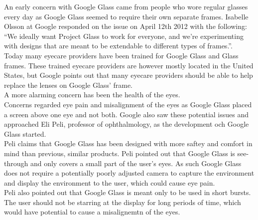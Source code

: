 An early concern with Google Glass came from people who wore regular glasses every day as Google Glass seemed to require their own separate frames. Isabelle Olsson at Google responded on the issue on April 12th 2012 with the following: ``We ideally want Project Glass to work for everyone, and we're experimenting with designs that are meant to be extendable to different types of frames.''.\cite{GoogleGlassFrameResponse}\\

Today many eyecare providers have been trained for Google Glass and Glass frames. These trained eyecare providers are however mostly located in the United States,\cite{frameProviders} but Google points out that many eyecare providers should be able to help replace the lenses on Google Glass' frame\cite{framesGlass}.\\ 

A more alarming concern has been the health of the eyes. \cite{ackerman13}\\Concerns regarded eye pain and misalignment of the eyes as Google Glass placed a screen above one eye and not both. Google also saw these potential issues and approached Eli Peli, professor of ophthalmology, as the development och Google Glass started.\\

Peli claims that Google Glass has been designed with more saftey and comfort in mind than previous, similar products. Peli pointed out that Google Glass is see-through and only covers a small part of the user's eyes. As such Google Glass does not require a potentially poorly adjusted camera to capture the environment and display the environment to the user, which could cause eye pain.\\

Peli also pointed out that Google Glass is meant only to be used in short bursts. The user should not be starring at the display for long periods of time, which would have potential to cause a misalignemtn of the eyes.\\


